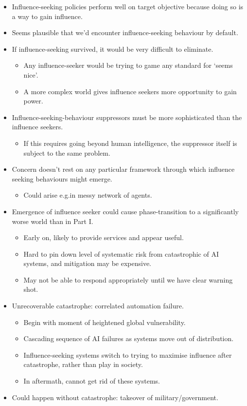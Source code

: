 \begin{itemize}
    \item Influence-seeking policies perform well on target objective because doing so is a way to gain influence.
    \item Seems plausible that we'd encounter influence-seeking behaviour by default.
    \item If influence-seeking survived, it would be very difficult to eliminate.
    \begin{itemize}
        \item Any influence-seeker would be trying to game any standard for `seems nice'.
        \item A more complex world gives influence seekers more opportunity to gain power.
    \end{itemize}
    \item Influence-seeking-behaviour suppressors must be more sophisticated than the influence seekers.
    \begin{itemize}
        \item If this requires going beyond human intelligence, the suppressor itself is subject to the same problem.
    \end{itemize}
    \item Concern doesn't rest on any particular framework through which influence seeking behaviours might emerge.
    \begin{itemize}
        \item Could arise e.g.\@ in messy network of agents.
    \end{itemize}
    \item Emergence of influence seeker could cause phase-transition to a significantly worse world than in Part I.
    \begin{itemize}
        \item Early on, likely to provide services and appear useful.
        \item Hard to pin down level of systematic risk from catastrophic of AI systems, and mitigation may be expensive.
        \item May not be able to respond appropriately until we have clear warning shot.
    \end{itemize}
    \item Unrecoverable catastrophe: correlated automation failure.
    \begin{itemize}
        \item Begin with moment of heightened global vulnerability.
        \item Cascading sequence of AI failures as systems move out of distribution.
        \item Influence-seeking systems switch to trying to maximise influence after catastrophe, rather than play in society.
        \item In aftermath, cannot get rid of these systems.
    \end{itemize}
    \item Could happen without catastrophe: takeover of military/government.
\end{itemize}


